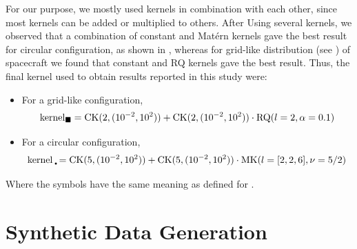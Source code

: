         For our purpose, we mostly used kernels in combination with each other, since most kernels
        can be added or multiplied to others. After Using several kernels, we observed that a
        combination of constant and Mat\'ern kernels gave the best result for circular
        configuration, as shown in , whereas for grid-like distribution (see
        ) of spacecraft we found that constant and RQ kernels gave the best
        result. Thus, the final kernel used to obtain results reported in this study were:\\


        \vspace{-1em}
        \begin{itemize}
            \item For a grid-like configuration,
            \begin{align}
                \begin{split}
                    {\rm kernel}_{\blacksquare} = {\rm CK}(2, (10^{-2}, 10^{2})) + {\rm CK}(2, (10^{-2}, 10^{2})) \cdot      {\rm RQ}(l=2, \alpha=0.1) \label{eq:fin_ker_grd}
                \end{split}
            \end{align}
            \item For a circular configuration,
            \begin{align}
                \begin{split}
                    {\rm kernel}_{~\Newdot} = {\rm CK}(5, (10^{-2}, 10^{2})) + {\rm CK}(5, (10^{-2}, 10^{2}))\cdot {\rm        MK}(l= [2,2,6], \nu=5/2) \label{eq:fin_ker_cir}
                \end{split}
            \end{align}
        \end{itemize}


        Where the symbols have the same meaning as defined for .

    \section{Synthetic Data Generation} \label{sec:data8}

